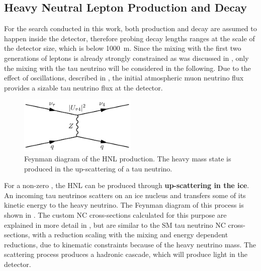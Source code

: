 \subsection{Heavy Neutral Lepton Production and Decay} 


For the search conducted in this work, both production and decay are assumed to happen inside the detector, therefore probing decay lengths ranges at the scale of the detector size, which is below \SI{1000}{\meter}. Since the mixing with the first two generations of leptons is already strongly constrained as was discussed in , only the mixing with the tau neutrino will be considered in the following. Due to the effect of oscillations, described in , the initial atmospheric muon neutrino flux provides a sizable tau neutrino flux at the detector.

\begin{figure}[h]
    \includegraphics[width=0.5\textwidth]{figures/hnl_simulation/theory/feyn_diags_production.png}
    \caption[Feynman diagram of heavy neutral lepton production]{Feynman diagram of the HNL production. The heavy mass state is produced in the up-scattering of a tau neutrino.}
\end{figure}

For a non-zero , the HNL can be produced through \textbf{up-scattering in the ice}. An incoming tau neutrinos scatters on an ice nucleus and transfers some of its kinetic energy to the heavy neutrino. The Feynman diagram of this process is shown in . The custom NC cross-sections calculated for this purpose are explained in more detail in , but are similar to the SM tau neutrino NC cross-sections, with a reduction scaling with the mixing  and energy dependent reductions, due to kinematic constraints because of the heavy neutrino mass. The scattering process produces a hadronic cascade, which will produce light in the detector.

